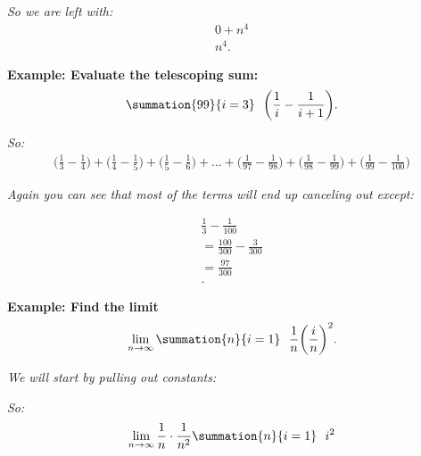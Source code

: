 \documentclass{report}
\begin{document}
\bigbreak \noindent 
\textit{So we are left with:}
\begin{align*}
  0 + n^{4}\\
  \boxed{n^{4}}
.\end{align*}


\pagebreak \bigbreak \noindent
\begin{mdframed}
  \textbf{Example: Evaluate the telescoping sum:}
  \begin{align*}
    \summation{99}{i=3}\ \ \bigg(\frac{1}{i} -\frac{1}{i+1}\bigg)
  .\end{align*} 
\end{mdframed}

\bigbreak \noindent
\textit{So:}
\begin{align*}
  \bigg(\frac{1}{3}-\frac{1}{4}\bigg) + \bigg(\frac{1}{4}-\frac{1}{5}\bigg) + \bigg(\frac{1}{5}-\frac{1}{6}\bigg) + ... + \bigg(\frac{1}{97} - \frac{1}{98}\bigg) + \bigg(\frac{1}{98} - \frac{1}{99}\bigg) + \bigg(\frac{1}{99} - \frac{1}{100}\bigg)
\end{align*}

\bigbreak \noindent 
\textit{Again you can see that most of the terms will end up canceling out except:}

\begin{align*}
  \frac{1}{3} -\frac{1}{100}  \\
  = \frac{100}{300} - \frac{3}{300} \\
  \boxed{= \frac{97}{300}} \\
.\end{align*}

\bigbreak \noindent 
\begin{mdframed}
  \textbf{Example: Find the limit}
  \begin{align*}
    \lim_{n \to \infty}{\summation{n}{i=1}\ \ \frac{1}{n}\bigg(\frac{i}{n}\bigg)^{2}}
  .\end{align*} 
\end{mdframed}

\bigbreak \noindent 
\textit{We will start by pulling out constants:}

\bigbreak \noindent
\textit{So:}
\begin{align*}
  \lim_{n \to \infty}{\frac{1}{n}\cdot \frac{1}{n^{2}} \summation{n}{i=1}\ \ i^{2}} 
\end{align*}
\end{document}
